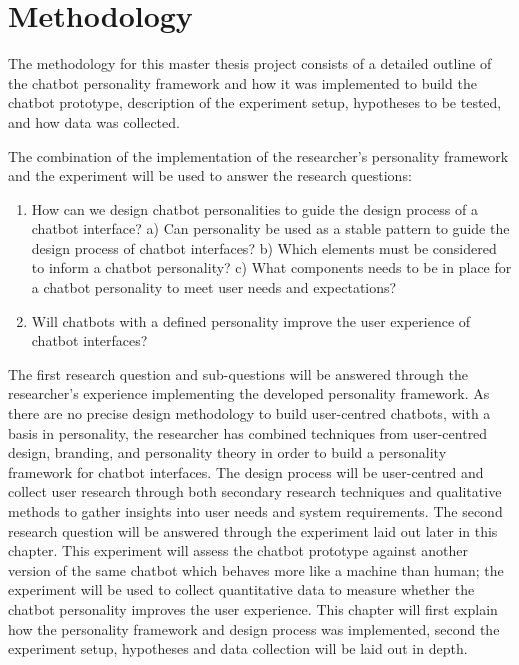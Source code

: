 \chapter{Methodology}
\label{chap:methodology}

The methodology for this master thesis project consists of a detailed outline of the chatbot personality framework and how it was implemented to build the chatbot prototype, description of the experiment setup, hypotheses to be tested, and how data was collected.

The combination of the implementation of the researcher's personality framework and the experiment will be used to answer the research questions:

\begin{enumerate}
    \item How can we design chatbot personalities to guide the design process of a chatbot interface? 
        \subitem a) Can personality be used as a stable pattern to guide the design \subitem    process of chatbot interfaces?
        \subitem b) Which elements must be considered to inform a chatbot personality?
        \subitem c) What components needs to be in place for a chatbot personality to \subitem  meet user needs and expectations?
    \item Will chatbots with a defined personality improve the user experience of chatbot interfaces?
\end{enumerate}

The first research question and sub-questions will be answered through the researcher's experience implementing the developed personality framework. As there are no precise design methodology to build user-centred chatbots, with a basis in personality, the researcher has combined techniques from user-centred design, branding, and personality theory in order to build a personality framework for chatbot interfaces. The design process will be user-centred and collect user research through both secondary research techniques and qualitative methods to gather insights into user needs and system requirements. The second research question will be answered through the experiment laid out later in this chapter. This experiment will assess the chatbot prototype against another version of the same chatbot which behaves more like a machine than human; the experiment will be used to collect quantitative data to measure whether the chatbot personality improves the user experience. This chapter will first explain how the personality framework and design process was implemented, second  the experiment setup, hypotheses and data collection will be laid out in depth.

